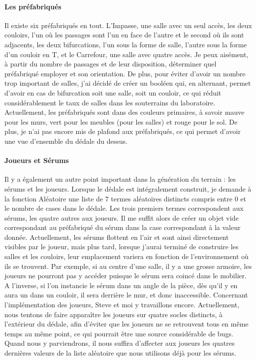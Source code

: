 \documentclass{article}
\begin{document}
\paragraph{Les préfabriqués}
Il existe six préfabriqués en tout. L'Impasse, une salle avec un seul accès, les deux couloirs, l'un où les passages sont l'un en face de l'autre et le second où ils sont adjacents, les deux bifurcations, l'un sous la forme de salle, l'autre sous la forme d'un couloir en T, et le Carrefour, une salle avec quatre accès. Je peux aisément, à partir du nombre de passages et de leur disposition, déterminer quel préfabriqué employer et son orientation. De plus, pour éviter d'avoir un nombre trop important de salles, j'ai décidé de créer un booléen qui, en alternant, permet d'avoir en cas de bifurcation soit une salle, soit un couloir, ce qui réduit considérablement le taux de salles dans les souterrains du laboratoire. Actuellement, les préfabriqués sont dans des couleurs primaires, à savoir mauve pour les murs, vert pour les meubles (pour les salles) et rouge pour le sol. De plus, je n'ai pas encore mis de plafond aux préfabriqués, ce qui permet d'avoir une vue d'ensemble du dédale du dessus.

\paragraph{Joueurs et Sérums}
Il y a également un autre point important dans la génération du terrain : les sérums et les joueurs.
Lorsque le dédale est intégralement construit, je demande à la fonction Aléatoire une liste de 7 termes aléatoires distincts compris entre 0 et le nombre de cases dans le dédale.
Les trois premiers termes correspondent aux sérums, les quatre autres aux joueurs. Il me suffit alors de créer un objet vide correspondant au préfabriqué du sérum dans la case correspondant à la valeur donnée. Actuellement, les sérums flottent en l'air et sont ainsi directement visibles par le joueur, mais plus tard, lorsque j'aurai terminé de construire les salles et les couloirs, leur emplacement variera en fonction de l'environnement où ils se trouvent. Par exemple, si au centre d'une salle, il y a une grosse armoire, les joueurs ne pourront pas y accéder puisque le sérum sera coincé dans le mobilier. A l'inverse, si l'on instancie le sérum dans un angle de la pièce, dès qu'il y en aura un dans un couloir, il sera derrière le mur, et donc inaccessible.
Concernant l'implémentation des joueurs, Steve et moi y travaillons encore. Actuellement, nous tentons de faire apparaître les joueurs sur quatre socles distincts, à l'extérieur du dédale, afin d'éviter que les joueurs ne se retrouvent tous en même temps au même point, ce qui pourrait être une source considérable de bugs. Quand nous y parviendrons, il nous suffira d'affecter aux joueurs les quatres dernières valeurs de la liste aléatoire que nous utilisons déjà pour les sérums.
\end{document}
